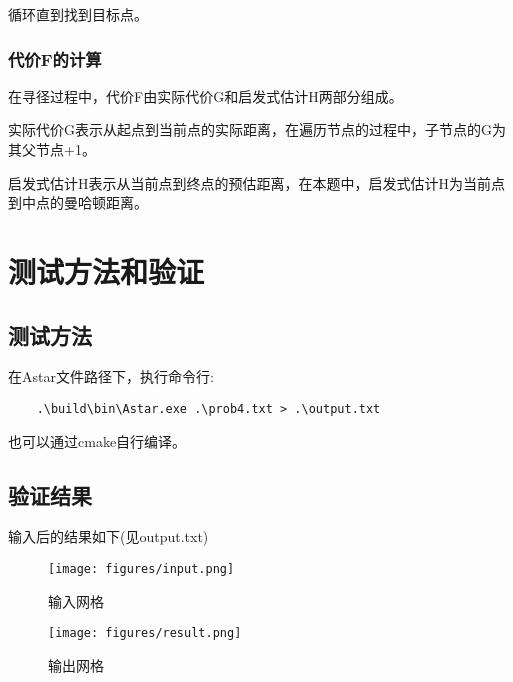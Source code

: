 \documentclass[12pt,hyperref,a4paper,UTF8]{ctexart}
\begin{document}
循环直到找到目标点。

\subsubsection{代价F的计算}

在寻径过程中，代价F由实际代价G和启发式估计H两部分组成。

实际代价G表示从起点到当前点的实际距离，在遍历节点的过程中，子节点的G为其父节点+1。

启发式估计H表示从当前点到终点的预估距离，在本题中，启发式估计H为当前点到中点的曼哈顿距离。

\section{测试方法和验证}

\subsection{测试方法}

在Astar文件路径下，执行命令行:

\begin{verbatim}
    .\build\bin\Astar.exe .\prob4.txt > .\output.txt
\end{verbatim}
    
也可以通过cmake自行编译。

\subsection{验证结果}

输入后的结果如下(见output.txt)

\begin{figure}[htbp]
    \centering
    \begin{minipage}[b]{0.45\textwidth}
        \centering
        \texttt{[image: figures/input.png]}
        \caption{输入网格}
        \label{fig:image1}
    \end{minipage}
    \hfill
    \begin{minipage}[b]{0.45\textwidth}
        \centering
        \texttt{[image: figures/result.png]}
        \caption{输出网格}
        \label{fig:image2}
    \end{minipage}
\end{figure}
\end{document}
